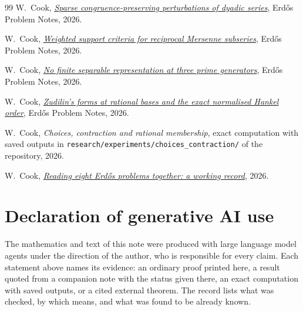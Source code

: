\documentclass[11pt]{article}
\begin{document}
\begin{thebibliography}{99}
 W.~Cook,
  \href{erdos-251-prime-gap-dyadic-series.pdf}{\emph{Sparse
  congruence-preserving perturbations of dyadic series}}, Erd\H{o}s Problem
  Notes, 2026.

 W.~Cook,
  \href{erdos-257-mersenne-support-subseries.pdf}{\emph{Weighted
  support criteria for reciprocal Mersenne subseries}}, Erd\H{o}s Problem Notes,
  2026.

 W.~Cook,
  \href{erdos-269-three-prime-running-lcm.pdf}{\emph{No
  finite separable representation at three prime generators}}, Erd\H{o}s Problem
  Notes, 2026.

 W.~Cook,
  \href{erdos-1049-rational-base-lambert.pdf}{\emph{Zudilin's
  forms at rational bases and the exact normalised Hankel order}}, Erd\H{o}s
  Problem Notes, 2026.

 W.~Cook,
  \emph{Choices, contraction and rational membership}, exact computation with saved outputs in \texttt{research/experiments/choices\_contraction/} of the repository,
  2026.

 W.~Cook,
  \href{erdos-synthesis-reading-together-record.pdf}{\emph{Reading
  eight Erd\H{o}s problems together: a working record}}, 2026.
\end{thebibliography}

\section*{Declaration of generative AI use}
The mathematics and text of this note were produced with large language model
agents under the direction of the author, who is responsible for every claim.
Each statement above names its evidence: an ordinary proof printed here, a
result quoted from a companion note with the status given there, an exact
computation with saved outputs, or a cited external theorem.  The record
\cite{plectisrecord} lists what was checked, by which means, and what was found
to be already known.
\end{document}
